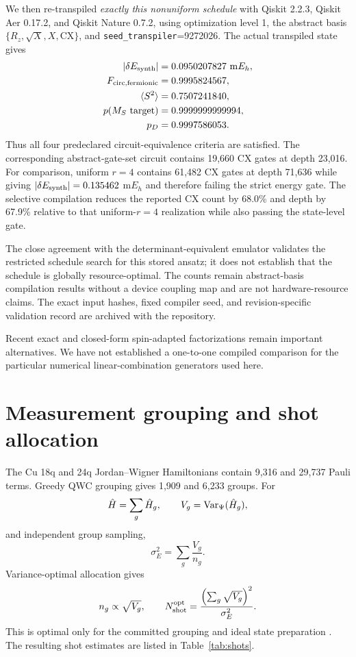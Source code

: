 \documentclass[
 aip,
 jcp,
 amsmath,amssymb,
 preprint
]{revtex4-2}
\begin{document}
We then re-transpiled \emph{exactly this nonuniform schedule} with Qiskit 2.2.3, Qiskit Aer 0.17.2, and Qiskit Nature 0.7.2, using optimization level 1, the abstract basis
$\{R_z,\sqrt X,X,\mathrm{CX}\}$, and \texttt{seed\_transpiler}=9272026.
The actual transpiled state gives
\begin{align}
|\delta E_{\rm synth}|&=0.0950207827~{\rm m}E_h,\\
F_{\rm circ,fermionic}&=0.9995824567,\\
\langle S^2\rangle&=0.7507241840,\\
p(M_S\text{ target})&=0.9999999999994,\\
p_D&=0.9997586053.
\end{align}
Thus all four predeclared circuit-equivalence criteria are satisfied.
The corresponding abstract-gate-set circuit contains 19,660 CX gates at depth 23,016.
For comparison, uniform $r=4$ contains 61,482 CX gates at depth 71,636 while giving
$|\delta E_{\rm synth}|=0.135462$ m$E_h$ and therefore failing the strict energy gate.
The selective compilation reduces the reported CX count by 68.0\% and depth by 67.9\% relative to that uniform-$r=4$ realization while also passing the state-level gate.

The close agreement with the determinant-equivalent emulator validates the restricted schedule search for this stored ansatz; it does not establish that the schedule is globally resource-optimal.
The counts remain abstract-basis compilation results without a device coupling map and are not hardware-resource claims.
The exact input hashes, fixed compiler seed, and revision-specific validation record are archived with the repository.

Recent exact and closed-form spin-adapted factorizations \cite{magoulas2025closedform,jain2026factorization} remain important alternatives.
We have not established a one-to-one compiled comparison for the particular numerical linear-combination generators used here.

\section{Measurement grouping and shot allocation}

The Cu 18q and 24q Jordan--Wigner Hamiltonians contain 9,316 and 29,737 Pauli terms.
Greedy QWC grouping gives 1,909 and 6,233 groups.
For
\begin{equation}
\hat H=\sum_g\hat H_g,\qquad
V_g={\rm Var}_\Psi(\hat H_g),
\end{equation}
and independent group sampling,
\begin{equation}
\sigma_E^2=\sum_g\frac{V_g}{n_g}.
\end{equation}
Variance-optimal allocation gives
\begin{equation}
n_g\propto\sqrt{V_g},
\qquad
N_{\rm shot}^{\rm opt}
=
\frac{\left(\sum_g\sqrt{V_g}\right)^2}{\sigma_E^2}.
\end{equation}
This is optimal only for the committed grouping and ideal state preparation \cite{verteletskyi2020measurement}.
The resulting shot estimates are listed in Table~\ref{tab:shots}.
\end{document}
